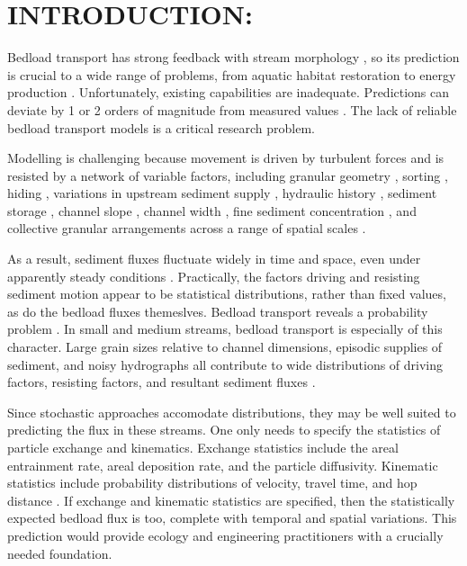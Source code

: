 \section{INTRODUCTION:}\label{sec:intro}
\linenumbers 

Bedload transport has strong feedback with stream morphology \citep{Church2015,Recking2016}, so its prediction is crucial to a wide range of problems, from aquatic habitat restoration to energy production \citep{McDonald2010, Kondolf2014, Wohl2015a}. Unfortunately, existing capabilities are inadequate. Predictions can deviate by 1 or 2 orders of magnitude from measured values \citep{Gomez1989, Martin2003, Recking2012}. The lack of reliable bedload transport models is a critical research problem. 
\bigskip 

Modelling is challenging because movement is driven by turbulent forces \citep{Schmeeckle2007,Celik2010, Dwivedi2010, Dwivedi2011, Amir2014, Celik2014, Vowinckel2016, Shih2017} and is resisted by a network of variable factors, including granular geometry \citep{Miller1966, Paintal1969, Paintal1971a}, sorting \citep{Parker1982, Lisle1992}, hiding \citep{Egiazaroff1965, Fenton1977}, variations in upstream sediment supply \citep{Madej2009, Elgueta2018}, hydraulic history \citep{Reid1985, Mao2012}, sediment storage \citep{Hoey1992}, channel slope \citep{Prancevic2015, Maurin2018}, channel width \citep{Zimmermann2010}, fine sediment concentration \citep{Wilcock1997}, and collective granular arrangements across a range of spatial scales \citep{Brayshaw1984, Church1998, Hassan2007, Venditti2017}. 
\bigskip 

As a result, sediment fluxes fluctuate widely in time and space, even under apparently steady conditions \citep{Drake1988, Hoey1992, Bohm2004, Radice2009, Singh2009, Turowski2010, Houssais2012, Roseberry2012, Ancey2014, Heyman2016}. Practically, the factors driving and resisting sediment motion appear to be statistical distributions, rather than fixed values, as do the bedload fluxes themeslves. Bedload transport reveals a probability problem \citep{Einstein1937}. In small and medium streams, bedload transport is especially of this character. Large grain sizes relative to channel dimensions, episodic supplies of sediment, and noisy hydrographs all contribute to wide distributions of driving factors, resisting factors, and resultant sediment fluxes \citep{Hassan2005, Church2006, Comiti2012, Church2015}. 
\bigskip 

Since stochastic approaches accomodate distributions, they may be well suited to predicting the flux in these streams. One only needs to specify the statistics of particle exchange and kinematics. Exchange statistics include the areal entrainment rate, areal deposition rate, and the particle diffusivity. Kinematic statistics include probability distributions of velocity, travel time, and hop distance \citep{Ancey2014, Furbish2016, Heyman2016}. If exchange and kinematic statistics are specified, then the statistically expected bedload flux is too, complete with temporal and spatial variations. This prediction would provide ecology and engineering practitioners with a crucially needed foundation. 
\bigskip 

